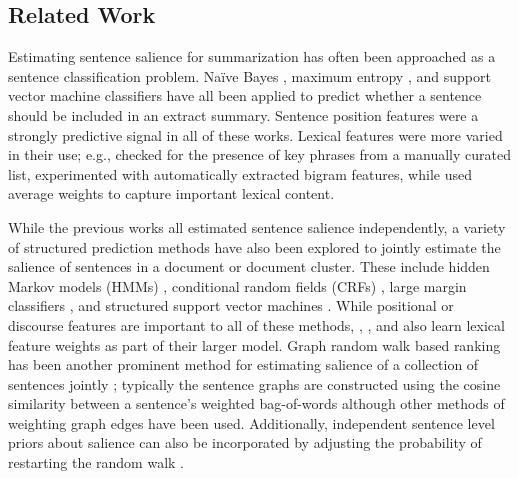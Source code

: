 
\subsection{Related Work}

Estimating sentence salience for summarization has often been approached as a 
sentence
classification problem. Na{\"i}ve Bayes 
\citep{kupiec1995trainable,teufel1997sentence,osborne2002using}, 
maximum entropy 
\citep{osborne2002using}, and support vector machine \citep{hirao2002ntt}
classifiers have all been applied to predict whether a sentence should
be included in an extract summary.
Sentence position features were a strongly predictive signal in all of these 
works.
Lexical features were more varied in their use; e.g., 
\cite{kupiec1995trainable} 
checked for the presence of key phrases from a manually curated list,
 \cite{osborne2002using} experimented with automatically extracted
bigram features, 
while \cite{hirao2002ntt} used average \tfidf{} weights to capture
important lexical content.

While the previous works all estimated sentence salience independently,
a variety of structured prediction methods have also been explored
to jointly estimate the salience of sentences in a document or 
document cluster.
These include
hidden Markov models (HMMs) \citep{conroy2001text}, conditional random fields
(CRFs)
\citep{shen2007document}, large margin classifiers \citep{martins2009summarization}, and 
structured support vector
machines 
\citep{berg2011jointly,sipos2012large,durrett2016learning}. 
While positional or discourse features are important to all of these methods, 
\cite{martins2009summarization}, \cite{berg2011jointly}, and \cite{durrett2016learning} 
also learn lexical feature weights as part of their larger model.
Graph random walk based ranking has been another
prominent method for estimating salience of a collection of sentences 
jointly 
\citep{erkan2004lexrank,mihalcea2004textrank};
typically the sentence graphs are constructed using the cosine similarity
between a sentence's \tfidf{} weighted bag-of-words although other methods
of weighting graph edges have been used. Additionally, independent
sentence level priors about salience can also be incorporated by adjusting the 
probability of restarting the random walk \citep{erkan1001using,liu2008personalized}.


